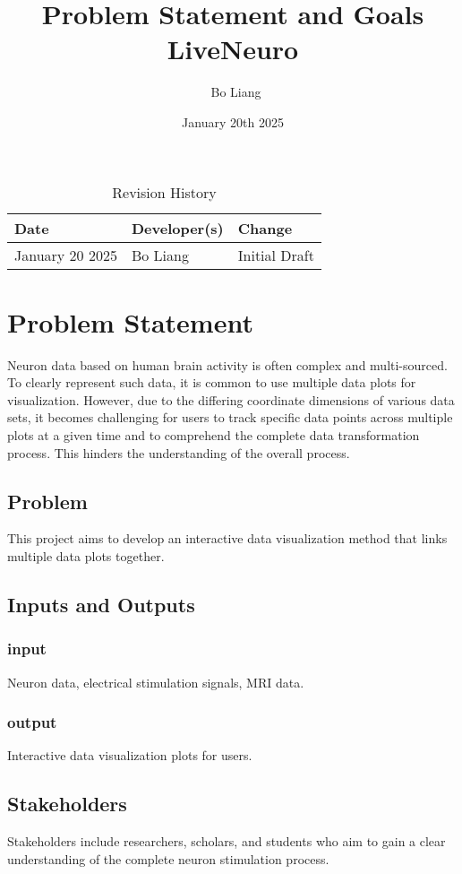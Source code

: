 \documentclass{article}
\title{Problem Statement and Goals\\LiveNeuro}
\author{\ Bo Liang}
\date{January 20th 2025}
\begin{document}
\maketitle

\begin{table}[hp]
\caption{Revision History} \label{TblRevisionHistory}
\begin{tabularx}{\textwidth}{llX}
\toprule
\textbf{Date} & \textbf{Developer(s)} & \textbf{Change}\\
\midrule
January 20 2025 & Bo Liang & Initial Draft\\
\bottomrule
\end{tabularx}
\end{table}

\section{Problem Statement}

Neuron data based on human brain activity is often complex and multi-sourced. To clearly represent such data, it is common to use multiple data plots for visualization. However, due to the differing coordinate dimensions of various data sets, it becomes challenging for users to track specific data points across multiple plots at a given time and to comprehend the complete data transformation process. This hinders the understanding of the overall process.

\subsection{Problem}
This project aims to develop an interactive data visualization method that links multiple data plots together.
\subsection{Inputs and Outputs}
\subsubsection{input}
Neuron data, electrical stimulation signals, MRI data.
\subsubsection{output}
Interactive data visualization plots for users.

\subsection{Stakeholders}
Stakeholders include researchers, scholars, and students who aim to gain a clear understanding of the complete neuron stimulation process.
\end{document}
